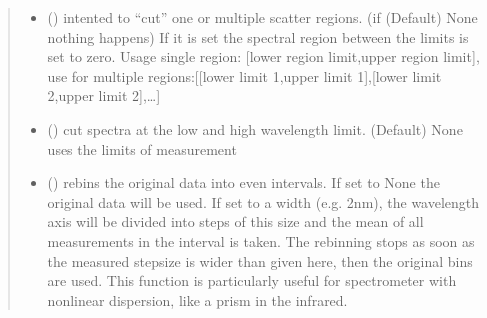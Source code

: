 \documentclass[letterpaper,10pt,english]{sphinxmanual}
\begin{document}
\begin{fulllineitems}
\begin{quote}
\begin{description}
\begin{itemize}
\item {} 
 (\sphinxstyleliteralemphasis{\sphinxupquote{ (}}\sphinxstyleliteralemphasis{\sphinxupquote{, }}\sphinxstyleliteralemphasis{\sphinxupquote{)}}\sphinxstyleliteralemphasis{\sphinxupquote{, }}) \textendash{} intented to “cut” one or multiple scatter regions. (if (Default) None nothing
happens) If it is set the spectral region between the limits is set to zero.
Usage single region: {[}lower region limit,upper region limit{]},
use for multiple regions:{[}{[}lower limit 1,upper limit 1{]},{[}lower limit 2,upper limit 2{]},…{]}

\item {} 
 (\sphinxstyleliteralemphasis{\sphinxupquote{ (}}\sphinxstyleliteralemphasis{\sphinxupquote{)}}\sphinxstyleliteralemphasis{\sphinxupquote{, }}) \textendash{} cut spectra at the low and high wavelength limit. (Default) None
uses the limits of measurement

\item {} 
 (\sphinxstyleliteralemphasis{\sphinxupquote{, }}) \textendash{} rebins the original data into even intervals. If set to None the original data will be used.
If set to a width (e.g. 2nm), the wavelength axis will be divided into steps of this size
and the mean of all measurements in the interval is taken. The re\sphinxhyphen{}binning stops as soon as
the measured stepsize is wider than given here, then the original bins are used.
This function is particularly useful for spectrometer with non\sphinxhyphen{}linear dispersion,
like a prism in the infrared.


\end{itemize}
\end{description}
\end{quote}
\end{fulllineitems}
\end{document}

